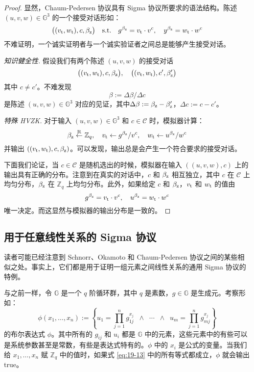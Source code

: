 \begin{proof}
显然，Chaum-Pedersen 协议具有 Sigma 协议所要求的语法结构。陈述 $(u,v,w)\in\mathbb{G}^3$ 的一个接受对话形如：
\[
\big((v_{\rm t},w_{\rm t}),c,\beta_{\rm z}\big)
\quad\text{s.t.}\quad
g^{\beta_{\rm z}}=v_{\rm t}\cdot v^c,
\quad
y^{\beta_{\rm z}}=w_{\rm t}\cdot w^c
\]
不难证明，一个诚实证明者与一个诚实验证者之间总是能够产生接受对话。

\noindent
\emph{知识健全性.}
假设我们有两个陈述 $(u,v,w)$ 的接受对话
\[
\big((v_{\rm t},w_{\rm t}),c,\beta_{\rm z}\big),
\quad
\big((v_{\rm t},w_{\rm t}),c',\beta_{\rm z}'\big)
\]
其中 $c\neq c'$。不难发现
\[
\beta:={\Delta\beta}/{\Delta c}
\]
是陈述 $(u,v,w)\in\mathbb{G}^3$ 对应的见证，其中$\Delta\beta:=\beta_{\rm z}-\beta_{\rm z}'$，$\Delta c:=c-c'$。

\vspace{5pt}

\noindent
\emph{特殊 HVZK.}
对于输入 $(u,v,w)\in\mathbb{G}^3$ 和 $c\in\mathcal{C}$ 时，模拟器计算：
\[
\beta_{\rm z}\overset{\rm R}\leftarrow\mathbb{Z}_q,
\quad
v_{\rm t}\leftarrow{g^{\beta_{\rm z}}}/{v^c},
\quad
w_{\rm t}\leftarrow{u^{\beta_{\rm z}}}/{w^c}
\]
并输出 $((v_{\rm t},w_{\rm t}),c,\beta_{\rm z})$。可以发现，输出总是会产生一个符合要求的接受对话。

下面我们论证，当 $c\in\mathcal{C}$ 是随机选出的时候，模拟器在输入 $((u,v,w),c)$ 上的输出具有正确的分布。注意到在真实的对话中，$c$ 和 $\beta_{\rm z}$ 相互独立，其中 $c$ 在 $\mathcal{C}$ 上均匀分布，$\beta_{\rm z}$ 在 $\mathbb{Z}_q$ 上均匀分布。此外，如果给定 $c$ 和 $\beta_{\rm z}$，$v_{\rm t}$ 和 $w_{\rm t}$ 的值由
\[
g^{\beta_{\rm z}}=v_{\rm t}\cdot v^c,
\quad
u^{\beta_{\rm z}} =w_{\rm t}\cdot w^c
\]
唯一决定。而这显然与模拟器的输出分布是一致的。
\end{proof}

\subsection{用于任意线性关系的 Sigma 协议}\label{subsec:19-5-3}

读者可能已经注意到 Schnorr、Okamoto 和 Chaum-Pedersen 协议之间的某些相似之处。事实上，它们都是用于证明一组元素之间线性关系的通用 Sigma 协议的特例。

与之前一样，令 $\mathbb{G}$ 是一个 $q$ 阶循环群，其中 $q$ 是素数，$g\in\mathbb{G}$ 是生成元。考察形如：
\begin{equation}\label{eq:19-13}
\phi(x_1,\dots,x_n):=
\left\{
u_1=\prod^n_{j=1}g_{1j}^{x_j}
\;\;\land\;\;\cdots\;\;\land\;\;
u_m=\prod^n_{j=1}g_{mj}^{x_j}
\right\}
\end{equation}
的布尔表达式 $\phi$。其中所有的 $g_{ij}$ 和 $u_i$ 都是 $\mathbb{G}$ 中的元素，这些元素中的有些可以是系统参数甚至是常数，有些是表达式特有的。$\phi$ 中的 $x_i$ 是公式的变量。当我们给 $x_1,\dots,x_n$ 赋 $\mathbb{Z}_q$ 中的值时，如果式 \ref{eq:19-13} 中的所有等式都成立，$\phi$ 就会输出 true。

